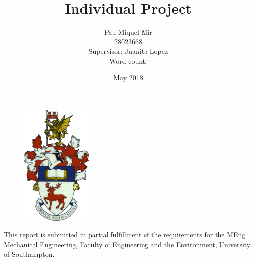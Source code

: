 \documentclass[11pt, twoside]{article}
\numberwithin{equation}{section}
\newcommand{\candidatenum}{28023668} %
\begin{document}


\title{Individual Project}
\author{
\vspace{0.1cm}
Pau Miquel Mir\\
\vspace{0.1cm}
\candidatenum \\
Supervisor: Juanito Lopez\\ 
Word count: \\
}

\date{May 2018}

\maketitle

\begin{figure}[htbp]
\begin{center}
\includegraphics[width=3.5cm]{coatofarms.png}
\end{center}
\end{figure}

\begin{center}
\large
This report is submitted in partial fulfillment of the requirements
for the MEng Mechanical Engineering, Faculty of Engineering and the
Environment, University of Southampton.
\end{center}

\cleardoublepage


\end{document}
